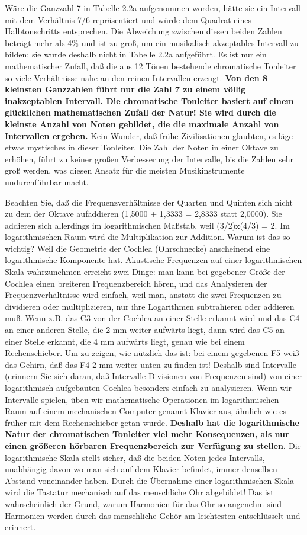 Wäre die Ganzzahl 7 in Tabelle 2.2a aufgenommen worden, hätte sie ein Intervall mit dem Verhältnis 7/6 repräsentiert und würde dem Quadrat eines Halbtonschritts entsprechen.
Die Abweichung zwischen diesen beiden Zahlen beträgt mehr als 4\% und ist zu groß, um ein musikalisch akzeptables Intervall zu bilden; sie wurde deshalb nicht in Tabelle 2.2a aufgeführt.
Es ist nur ein mathematischer Zufall, daß die aus 12 Tönen bestehende chromatische Tonleiter so viele Verhältnisse nahe an den reinen Intervallen erzeugt.
\textbf{Von den 8 kleinsten Ganzzahlen führt nur die Zahl 7 zu einem völlig inakzeptablen Intervall.
Die chromatische Tonleiter basiert auf einem glücklichen mathematischen Zufall der Natur!
Sie wird durch die kleinste Anzahl von Noten gebildet, die die maximale Anzahl von Intervallen ergeben.}
Kein Wunder, daß frühe Zivilisationen glaubten, es läge etwas mystisches in dieser Tonleiter.
Die Zahl der Noten in einer Oktave zu erhöhen, führt zu keiner großen Verbesserung der Intervalle, bis die Zahlen sehr groß werden, was diesen Ansatz für die meisten Musikinstrumente undurchführbar macht.

Beachten Sie, daß die Frequenzverhältnisse der Quarten und Quinten sich nicht zu dem der Oktave aufaddieren (1,5000 + 1,3333 = 2,8333 statt 2,0000).
Sie addieren sich allerdings im logarithmischen Maßstab, weil (3/2)x(4/3) = 2.
Im logarithmischen Raum wird die Multiplikation zur Addition.
Warum ist das so wichtig?
Weil die Geometrie der Cochlea (Ohrschnecke) anscheinend eine logarithmische Komponente hat.
Akustische Frequenzen auf einer logarithmischen Skala wahrzunehmen erreicht zwei Dinge: man kann bei gegebener Größe der Cochlea einen breiteren Frequenzbereich hören, und das Analysieren der Frequenzverhältnisse wird einfach, weil man, anstatt die zwei Frequenzen zu dividieren oder multiplizieren, nur ihre Logarithmen subtrahieren oder addieren muß.
Wenn z.B. das C3 von der Cochlea an einer Stelle erkannt wird und das C4 an einer anderen Stelle, die 2 mm weiter aufwärts liegt, dann wird das C5 an einer Stelle erkannt, die 4 mm aufwärts liegt, genau wie bei einem Rechenschieber.
Um zu zeigen, wie nützlich das ist: bei einem gegebenen F5 weiß das Gehirn, daß das F4 2 mm weiter unten zu finden ist!
Deshalb sind Intervalle (erinnern Sie sich daran, daß Intervalle Divisionen von Frequenzen sind) von einer logarithmisch aufgebauten Cochlea besonders einfach zu analysieren.
Wenn wir Intervalle spielen, üben wir mathematische Operationen im logarithmischen Raum auf einem mechanischen Computer genannt Klavier aus, ähnlich wie es früher mit dem Rechenschieber getan wurde.
\textbf{Deshalb hat die logarithmische Natur der chromatischen Tonleiter viel mehr Konsequenzen, als nur einen größeren hörbaren Frequenzbereich zur Verfügung zu stellen.}
Die logarithmische Skala stellt sicher, daß die beiden Noten jedes Intervalls, unabhängig davon wo man sich auf dem Klavier befindet, immer denselben Abstand voneinander haben.
Durch die Übernahme einer logarithmischen Skala wird die Tastatur mechanisch auf das menschliche Ohr abgebildet!
Das ist wahrscheinlich der Grund, warum Harmonien für das Ohr so angenehm sind - Harmonien werden durch das menschliche Gehör am leichtesten entschlüsselt und erinnert.

